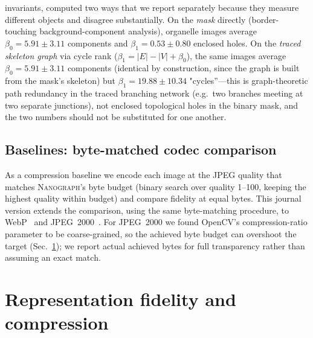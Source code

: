 \documentclass[10pt,a4paper]{article}
\newcommand{\method}{\textnormal{\textsc{Nanograph}}\xspace}
\begin{document}
\begin{itemize}
invariants, computed two ways that we report separately because they measure
different objects and disagree substantially. On the \emph{mask} directly
(border-touching background-component analysis), organelle images average
$\beta_0=5.91\pm3.11$ components and $\beta_1=0.53\pm0.80$ enclosed holes. On
the \emph{traced skeleton graph} via cycle rank ($\beta_1=|E|-|V|+\beta_0$),
the same images average $\beta_0=5.91\pm3.11$ components (identical by
construction, since the graph is built from the mask's skeleton) but
$\beta_1=19.88\pm10.34$ "cycles''---this is graph-theoretic path redundancy
in the traced branching network (e.g.\ two branches meeting at two separate
junctions), not enclosed topological holes in the binary mask, and the two
numbers should not be substituted for one another.
\end{itemize}

\subsection{Baselines: byte-matched codec comparison}
As a compression baseline we encode each image at the JPEG quality that
matches \method's byte budget (binary search over quality 1--100, keeping the
highest quality within budget) and compare fidelity at equal bytes. This
journal version extends the comparison, using the same byte-matching
procedure, to WebP~\cite{webp} and JPEG~2000~\cite{skodras2001jpeg2000}. For
JPEG~2000 we found OpenCV's compression-ratio parameter to be coarse-grained,
so the achieved byte budget can overshoot the target (Sec.~\ref{sec:repr});
we report actual achieved bytes for full transparency rather than assuming an
exact match.

\section{Representation fidelity and compression}\label{sec:repr}
\end{document}
